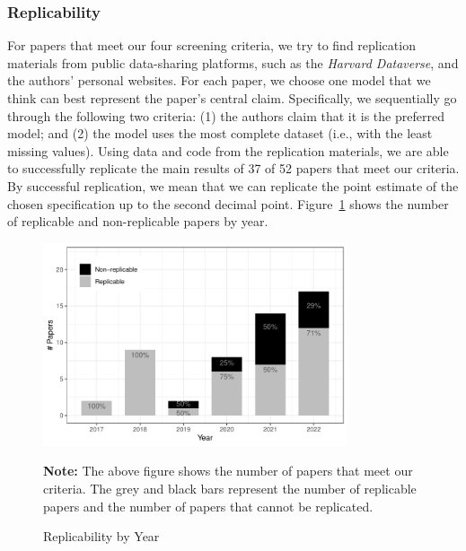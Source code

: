 \documentclass[12pt]{article}
\begin{document}
\subsubsection{Replicability} 

For papers that meet our four screening criteria, we try to find replication materials from public data-sharing platforms, such as the \textit{Harvard Dataverse}, and the authors' personal websites. For each paper, we choose one model that we think can best represent the paper's central claim. Specifically, we sequentially go through the following two criteria: (1) the authors claim that it is the preferred model; and (2) the model uses the most complete dataset (i.e., with the least missing values). Using data and code from the replication materials, we are able to successfully replicate the main results of 37 of 52 papers that meet our criteria. By successful replication, we mean that we can replicate the point estimate of the chosen specification up to the second decimal point. Figure~\ref{fg:paper.by.year} shows the number of replicable and non-replicable papers by year. 

\begin{figure}[!ht]
\caption{Replicability by Year}  \label{fg:paper.by.year}
\centering
\begin{minipage}{0.8\linewidth}{
\begin{center}
\includegraphics[width = 0.8\textwidth]{figure/summary/rep.results.year.pdf}
\end{center}
\footnotesize\textbf{Note:} The above figure shows the number of papers that meet our criteria. The grey and black bars represent the number of replicable papers and the number of papers that cannot be replicated. 
}\end{minipage}
\end{figure}

\clearpage
\end{document}
